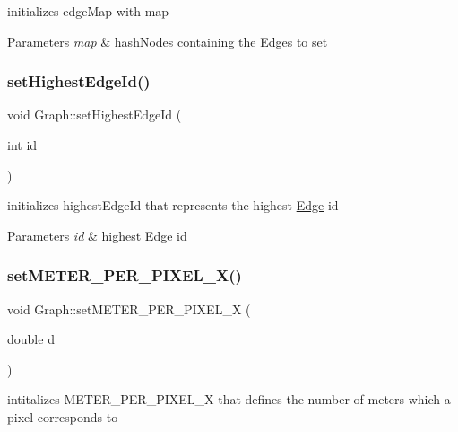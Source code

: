 initializes edge\+Map with map 


\begin{DoxyParams}{Parameters}
{\em map} & hash\+Nodes containing the Edges to set \\
\hline
\end{DoxyParams}
\mbox{\label{class_graph_ab52ab0dd69a65e534ef447af5efadb7e}} 
\subsubsection{\texorpdfstring{set\+Highest\+Edge\+Id()}{setHighestEdgeId()}}
{\footnotesize\ttfamily void Graph\+::set\+Highest\+Edge\+Id (\begin{DoxyParamCaption}\item[{int}]{id }\end{DoxyParamCaption})}



initializes highest\+Edge\+Id that represents the highest \hyperlink{class_edge}{Edge} id 


\begin{DoxyParams}{Parameters}
{\em id} & highest \hyperlink{class_edge}{Edge} id \\
\hline
\end{DoxyParams}
\mbox{\label{class_graph_a4e0ee1d777ad38c4664ce9ee3da550a4}} 
\subsubsection{\texorpdfstring{set\+M\+E\+T\+E\+R\+\_\+\+P\+E\+R\+\_\+\+P\+I\+X\+E\+L\+\_\+\+X()}{setMETER\_PER\_PIXEL\_X()}}
{\footnotesize\ttfamily void Graph\+::set\+M\+E\+T\+E\+R\+\_\+\+P\+E\+R\+\_\+\+P\+I\+X\+E\+L\+\_\+X (\begin{DoxyParamCaption}\item[{double}]{d }\end{DoxyParamCaption})}



intitalizes M\+E\+T\+E\+R\+\_\+\+P\+E\+R\+\_\+\+P\+I\+X\+E\+L\+\_\+X that defines the number of meters which a pixel corresponds to 


